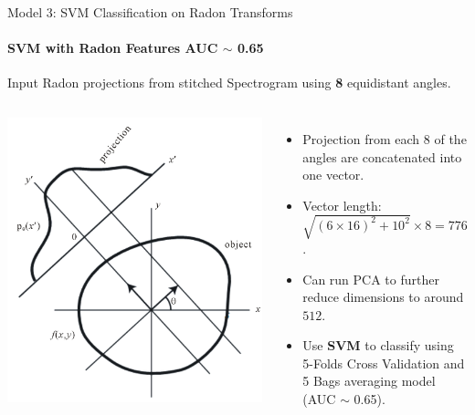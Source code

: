 \documentclass{beamer}
\begin{document}
\begin{frame}{Model 3: SVM Classification on Radon Transforms}
  \framesubtitle{SVM with Radon Features AUC $\sim$ 0.65}

  \begin{block}{Input}
    Radon projections from stitched Spectrogram using \textbf{8} equidistant angles.
  \end{block}

  \begin{columns}

    \begin{center}
  \includegraphics*[scale=0.1]{img/radon_feats.jpg}
    \end{center}

  \begin{itemize}
    \item Projection from each $8$ of the angles are concatenated into one vector.
    \item Vector length: $\sqrt{(6 \times 16)^2 + 10^2} \times 8 = 776$.
    \item Can run PCA to further reduce dimensions to around $512$.
    \item Use \textbf{SVM} to classify using 5-Folds Cross Validation and 5 Bags
      averaging model (AUC $\sim$ 0.65).
  \end{itemize}
  \end{columns}


\end{frame}
\end{document}
